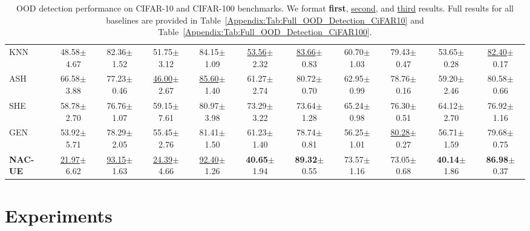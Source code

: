 \documentclass{article} \usepackage{iclr2024_conference,times}
\begin{document}
\begin{table*}
{\begin{tabular}{l cc cc cc cc cc}
			KNN & 48.58{\tiny$\pm$4.67} &  82.36{\tiny$\pm$1.52} &  51.75{\tiny$\pm$3.12} &  84.15{\tiny$\pm$1.09} &  \underline{53.56}{\tiny$\pm$2.32} &  \underline{83.66}{\tiny$\pm$0.83} &  60.70{\tiny$\pm$1.03} &  79.43{\tiny$\pm$0.47} &  53.65{\tiny$\pm$0.28} &  \underline{82.40}{\tiny$\pm$0.17 }\\ 
ASH & 66.58{\tiny$\pm$3.88} &  77.23{\tiny$\pm$0.46} &  \underline{46.00}{\tiny$\pm$2.67} &  \underline{85.60}{\tiny$\pm$1.40} &  61.27{\tiny$\pm$2.74} &  80.72{\tiny$\pm$0.70} &  62.95{\tiny$\pm$0.99} &  78.76{\tiny$\pm$0.16} &  59.20{\tiny$\pm$2.46} &  80.58{\tiny$\pm$0.66 }\\ 
			SHE & 58.78{\tiny$\pm$2.70} &  76.76{\tiny$\pm$1.07} &  59.15{\tiny$\pm$7.61} &  80.97{\tiny$\pm$3.98} &  73.29{\tiny$\pm$3.22} &  73.64{\tiny$\pm$1.28} &  65.24{\tiny$\pm$0.98} &  76.30{\tiny$\pm$0.51} &  64.12{\tiny$\pm$2.70} &  76.92{\tiny$\pm$1.16 }\\ 
			GEN & 53.92{\tiny$\pm$5.71} &  78.29{\tiny$\pm$2.05} &  55.45{\tiny$\pm$2.76} &  81.41{\tiny$\pm$1.50} &  61.23{\tiny$\pm$1.40} &  78.74{\tiny$\pm$0.81} &  56.25{\tiny$\pm$1.01} &  \underline{80.28}{\tiny$\pm$0.27} &  56.71{\tiny$\pm$1.59} &  79.68{\tiny$\pm$0.75 }\\ 
			\rowcolor{LightGray}
			\textbf{NAC-UE} & \underline{21.97}{\tiny$\pm$6.62 } &  \underline{93.15}{\tiny$\pm$1.63 } &  \underline{24.39}{\tiny$\pm$4.66 } &  \underline{92.40}{\tiny$\pm$1.26 } &  \textbf{40.65}{\tiny$\pm$1.94 } &  \textbf{89.32}{\tiny$\pm$0.55 } &  73.57{\tiny$\pm$1.16  } &  73.05{\tiny$\pm$0.68 } &  \textbf{40.14}{\tiny$\pm$1.86 } &  \textbf{86.98}{\tiny$\pm$0.37 }\\ 
			
			\bottomrule
		\end{tabular}
	}
	\vspace{-1.5mm}
	\caption{OOD detection performance on CIFAR-10 and CIFAR-100 benchmarks. We format \textbf{first}, \underline{second}, and \underline{third} results. Full results for all baselines are provided in Table~\ref{Appendix:Tab:Full_OOD_Detection_CiFAR10} and Table~\ref{Appendix:Tab:Full_OOD_Detection_CiFAR100}.}
	\label{table:OOD_Detection_CIFAR}
	\vspace{-2mm}
\end{table*}










\vspace{-2mm}
\section{Experiments}
\vspace{-2mm}
\end{document}
